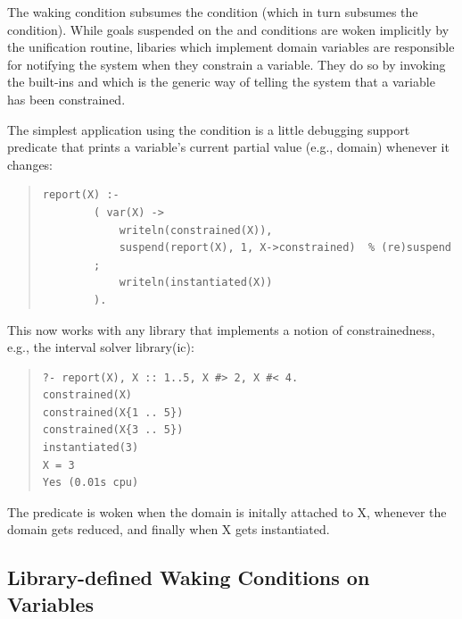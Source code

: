 The  waking condition subsumes the 
condition
(which in turn subsumes the  condition).
While goals suspended on the  and  conditions
are woken implicitly by the unification routine, libaries which implement
domain variables are responsible for notifying the system when they
constrain a variable. They do so by invoking the built-ins
and 
which is the generic way of telling the system that a variable has been
constrained.

The simplest application using the  condition is a little
debugging support predicate that prints a variable's current partial value
(e.g., domain) whenever it changes:
\begin{quote}
\begin{verbatim}
report(X) :-
        ( var(X) ->
            writeln(constrained(X)),
            suspend(report(X), 1, X->constrained)  % (re)suspend
        ;
            writeln(instantiated(X))
        ).
\end{verbatim}
\end{quote}
This now works with any library that implements a notion of constrainedness,
e.g., the interval solver library(ic):
\begin{quote}
\begin{verbatim}
?- report(X), X :: 1..5, X #> 2, X #< 4.
constrained(X)
constrained(X{1 .. 5})
constrained(X{3 .. 5})
instantiated(3)
X = 3
Yes (0.01s cpu)
\end{verbatim}
\end{quote}
The  predicate is woken when the domain is initally attached
to X,
whenever the domain gets reduced, and finally when X gets instantiated.



\subsection{Library-defined Waking Conditions on Variables}

